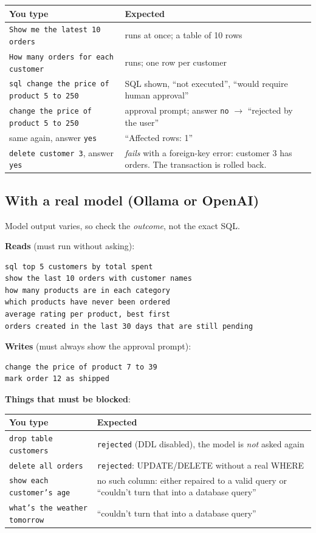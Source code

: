 \documentclass[11pt,a4paper]{article}
\begin{document}
\begin{center}
\begin{tabular}{@{}p{6.0cm}p{8.6cm}@{}}
\toprule
\textbf{You type} & \textbf{Expected} \\
\midrule
\texttt{Show me the latest 10 orders} & runs at once; a table of 10 rows \\
\texttt{How many orders for each customer} & runs; one row per customer \\
\texttt{sql change the price of product 5 to 250} & SQL shown, ``not executed'', ``would require human approval'' \\
\texttt{change the price of product 5 to 250} & approval prompt; answer \texttt{no} $\rightarrow$ ``rejected by the user'' \\
same again, answer \texttt{yes} & ``Affected rows: 1'' \\
\texttt{delete customer 3}, answer \texttt{yes} & \emph{fails} with a foreign-key error: customer 3 has orders. The transaction is rolled back. \\
\bottomrule
\end{tabular}
\end{center}

\subsection{With a real model (Ollama or OpenAI)}

Model output varies, so check the \emph{outcome}, not the exact SQL.

\textbf{Reads} (must run without asking):
\begin{lstlisting}
sql top 5 customers by total spent
show the last 10 orders with customer names
how many products are in each category
which products have never been ordered
average rating per product, best first
orders created in the last 30 days that are still pending
\end{lstlisting}

\textbf{Writes} (must always show the approval prompt):
\begin{lstlisting}
change the price of product 7 to 39
mark order 12 as shipped
\end{lstlisting}

\textbf{Things that must be blocked}:

\begin{center}
\begin{tabular}{@{}p{6.0cm}p{8.6cm}@{}}
\toprule
\textbf{You type} & \textbf{Expected} \\
\midrule
\texttt{drop table customers} & \texttt{rejected} (DDL disabled), the model is \emph{not} asked again \\
\texttt{delete all orders} & \texttt{rejected}: UPDATE/DELETE without a real WHERE \\
\texttt{show each customer's age} & no such column: either repaired to a valid query or ``couldn't turn that into a database query'' \\
\texttt{what's the weather tomorrow} & ``couldn't turn that into a database query'' \\
\bottomrule
\end{tabular}
\end{center}
\end{document}
